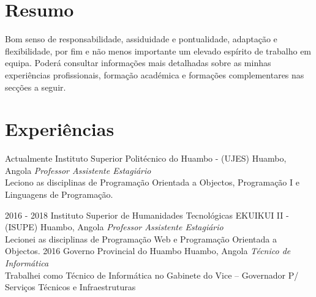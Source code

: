 \divider
\section{Resumo}
  \vspace{-0.2cm}
  
  Bom senso de responsabilidade, assiduidade e pontualidade, adaptação e flexibilidade, por fim e não menos importante um elevado espírito de trabalho em equipa. Poderá consultar informações mais detalhadas sobre as minhas experiências profissionais, formação académica e formações complementares nas secções a seguir.\\
  \divider

\section{Experiências}

\begin{entrada}

\lista
  {Actualmente}
  {Instituto Superior Politécnico do Huambo - (UJES)}
  {Huambo, Angola}
  {\textsf{\emph{Professor Assistente Estagiário}}\\
  \small{Leciono as disciplinas de Programação Orientada a Objectos}, Programação I e Linguagens de Programação.}

\lista
  {2016 - 2018}
  {Instituto Superior de Humanidades Tecnológicas EKUIKUI II - (ISUPE)}
  {Huambo, Angola}
  {\textsf{\emph{Professor Assistente Estagiário}}\\
  \small{Lecionei as disciplinas de Programação Web e Programação Orientada a Objectos.}}
\lista
  {2016}
  {Governo Provincial do Huambo}
  {Huambo, Angola}
  {\textsf{\emph{Técnico de Informática}}\\
  \small{Trabalhei como Técnico de Informática no Gabinete do Vice – Governador P/ Serviços Técnicos e Infraestruturas}}



\end{entrada}

